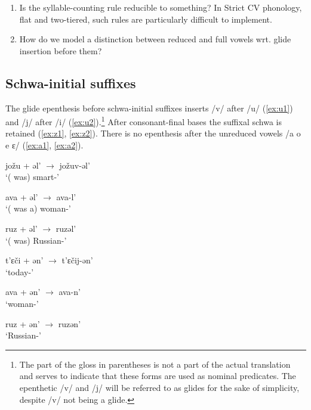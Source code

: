 \documentclass[a4paper, 12pt]{article}
\begin{document}
	\begin{enumerate}[$\gg$]
		\item Is the syllable-counting rule reducible to something? In Strict CV phonology, flat and two-tiered, such rules are particularly difficult to implement.
		\item How do we model a distinction between reduced and full vowels wrt. glide insertion before them?
	\end{enumerate}
				
			\subsection{Schwa-initial suffixes}
			
	 The glide epenthesis before schwa-initial suffixes inserts /v/ after /u/ (\ref{ex:u1}) and /j/ after /i/ (\ref{ex:u2}).\footnote{The part of the gloss in parentheses is not a part of the actual translation and serves to indicate that these forms are used as nominal predicates. The epenthetic /v/ and /j/ will be referred to as glides for the sake of simplicity, despite /v/ not being a glide.} After consonant-final bases the suffixal schwa is retained (\ref{ex:z1}, \ref{ex:z2}). There is no epenthesis after the unreduced vowels /a o e ɛ/ (\ref{ex:a1}, \ref{ex:a2}).
	
\begin{minipage}[t]{.3\linewidth}
\ex\label{ex:u1}
	jožu + əl' $\rightarrow$ jožuv-əl' \\`({\Tsg} was) smart-{\Ipf}'
\xe
\end{minipage}
\hfill
\begin{minipage}[t]{.315\linewidth}
\ex\label{ex:a1}
	ava + əl' $\rightarrow$ ava-l' \\`({\Tsg} was a) woman-{\Ipf}'
\xe
\end{minipage}	
\hfill
\begin{minipage}[t]{.33\linewidth}
\ex\label{ex:z1}
	ruz + əl' $\rightarrow$ ruzəl' \\`({\Tsg} was) Russian-{\Ipf}'
\xe
\end{minipage}

\begin{minipage}[t]{.3\linewidth}
\ex\label{ex:u2}
	t'ɛči + ən' $\rightarrow$ t'ɛčij-ən' \\`today-{\Gen}'
\xe
\end{minipage}	
\hfill
\begin{minipage}[t]{.315\linewidth}
\ex\label{ex:a2}
	ava + ən' $\rightarrow$ ava-n' \\`woman-{\Gen}'
\xe
\end{minipage}	
\hfill
\begin{minipage}[t]{.33\linewidth}
\ex\label{ex:z2}
	ruz + ən' $\rightarrow$ ruzən' \\`Russian-{\Gen}'
\xe
\end{minipage}
	
\end{document}
